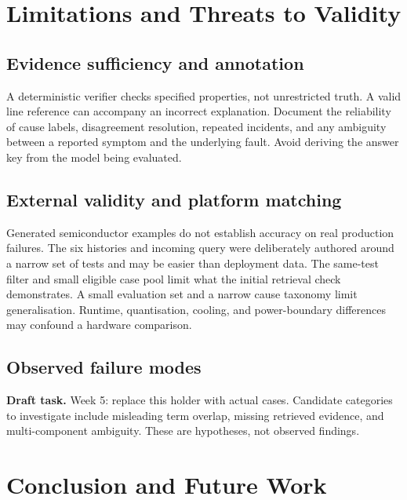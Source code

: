 \documentclass[conference]{IEEEtran}
\newcommand{\draftnote}[1]{%
\par\smallskip\noindent
\colorbox{pale}{%
\parbox{\dimexpr\columnwidth-2\fboxsep\relax}{%
\small\textbf{Draft task.} #1}}%
\par\smallskip}
\newcommand{\placeholder}[2]{%
\noindent\fbox{%
\parbox[c][#1][c]{0.94\columnwidth}{%
\centering\small\textcolor{accent}{#2}}}}
\begin{document}
\section{Limitations and Threats to Validity}

\subsection{Evidence sufficiency and annotation}

A deterministic verifier checks specified properties,
not unrestricted truth. A valid line reference can accompany
an incorrect explanation. Document the reliability of cause
labels, disagreement resolution, repeated incidents, and any
ambiguity between a reported symptom and the underlying fault.
Avoid deriving the answer key from the model being evaluated.

\subsection{External validity and platform matching}

Generated semiconductor examples do not establish accuracy
on real production failures. The six histories and incoming
query were deliberately authored around a narrow set of tests
and may be easier than deployment data. The same-test filter
and small eligible case pool limit what the initial retrieval
check demonstrates. A small evaluation set and a narrow cause
taxonomy limit generalisation. Runtime, quantisation, cooling,
and power-boundary differences may confound a hardware comparison.

\subsection{Observed failure modes}

\placeholder{21mm}{
Failure-mode holder\\
Record at least three measured categories.\\
For each: case IDs, evidence, failure mechanism, mitigation.
}

\draftnote{
Week 5: replace this holder with actual cases.
Candidate categories to investigate include misleading
term overlap, missing retrieved evidence, and multi-component
ambiguity. These are hypotheses, not observed findings.
}

\section{Conclusion and Future Work}
\end{document}
